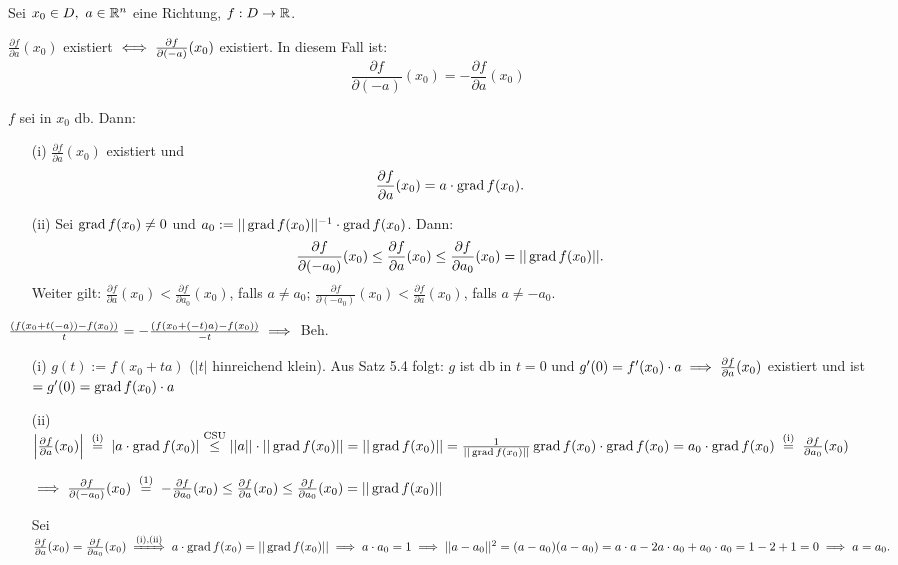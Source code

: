 \documentclass[a4paper,twoside,DIV15,BCOR12mm,chapterprefix=true,headings=twolinechapter]{scrbook}
\begin{document}
\begin{satz}[Richtungsableitungen]
Sei $x_0 \in D,\ a \in \mathbb{R}^n$ eine Richtung, $f:D \to \mathbb{R}$.
\begin{liste}
\item $\frac{\partial f}{\partial a}(x_0)$ existiert $\iff \frac{\partial f}{\partial (-a)}(x_0)$ existiert. In diesem Fall ist: $$\frac{\partial f}{\partial (-a)}(x_0) = -\frac{\partial f}{\partial a}(x_0)$$
\item $f$ sei in $x_0$ db. Dann:
\begin{enumerate}
\item[(i)] $\frac{\partial f}{\partial a}(x_0)$ existiert und $$\frac{\partial f}{\partial a}(x_0) = a\cdot \mathop{\rm grad}\nolimits f(x_0).$$
\item[(ii)] Sei $\mathop{\rm grad}\nolimits f(x_0) \ne 0$ und $a_0 := ||\mathop{\rm grad}\nolimits f(x_0)||^{-1}\cdot \mathop{\rm grad}\nolimits f(x_0)$. Dann: $$\frac{\partial f}{\partial (-a_0)}(x_0) \le \frac{\partial f}{\partial a}(x_0) \le \frac{\partial f}{\partial a_0}(x_0) = ||\mathop{\rm grad}\nolimits f(x_0)||.$$ Weiter gilt: $\frac{\partial f}{\partial a}(x_0) < \frac{\partial f}{\partial a_0}(x_0)$, falls $a \ne a_0$; $\frac{\partial f}{\partial (-a_0)}(x_0) < \frac{\partial f}{\partial a}(x_0)$, falls $a \ne -a_0$.
\end{enumerate}
\end{liste}
\end{satz}

\begin{beweis}
\begin{liste}
\item $\frac{(f(x_0+t(-a))-f(x_0))}{t} = -\frac{(f(x_0+(-t)a)-f(x_0))}{-t} \implies$ Beh.
\item \begin{enumerate}
\item[(i)] $g(t) := f(x_0+ta)$ ($|t|$ hinreichend klein). Aus Satz 5.4 folgt: $g$ ist db in $t=0$ und $g'(0) = f'(x_0) \cdot a \implies \frac{\partial f}{\partial a}(x_0)$ existiert und ist $= g'(0) = \mathop{\rm grad}\nolimits f(x_0)\cdot a$
\item[(ii)] $\left| \frac{\partial f}{\partial a}(x_0) \right| \gleichnach{(i)} |a\cdot \grad f(x_0)| \overset{\text{CSU}}{\le} ||a||\cdot ||\grad f(x_0)|| = ||\grad f(x_0)|| = \frac{1}{||\grad f(x_0)||} \grad f(x_0) \cdot \grad f(x_0) = a_0\cdot \grad f(x_0) \gleichnach{(i)} \frac{\partial f}{\partial a_0}(x_0)$

$\folgt \frac{\partial f}{\partial (-a_0)}(x_0) \gleichnach{(1)} -\frac{\partial f}{\partial a_0}(x_0) \le \frac{\partial f}{\partial a}(x_0) \le \frac{\partial f}{\partial a_0}(x_0) = ||\grad f(x_0)||$

Sei $\frac{\partial f}{\partial a}(x_0) = \frac{\partial f}{\partial a_0}(x_0) \folgtnach{(i),(ii)} a\cdot\grad f(x_0) = ||\grad f(x_0)|| \folgt a\cdot a_0 = 1 \folgt ||a-a_0||^2 = (a-a_0)(a-a_0) = a\cdot a - 2a\cdot a_0 + a_0\cdot a_0 = 1-2+1 = 0 \folgt a=a_0.$
\end{enumerate}
\end{liste}
\end{beweis}
\end{document}
